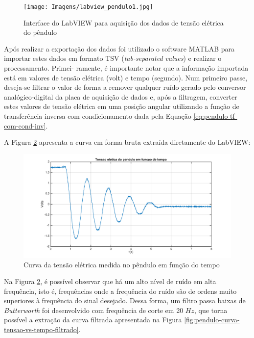 \documentclass[a4paper]{instrumentacao}
\begin{document}
\begin{figure}[H]
\centering
\texttt{[image: Imagens/labview\_pendulo1.jpg]}
\caption{Interface do LabVIEW para aquisição dos dados de tensão elétrica do pêndulo}
\label{fig:pendulo-LabVIEW}
\end{figure}

Após realizar a exportação dos dados foi utilizado o software MATLAB para importar estes dados em formato TSV (\textit{tab-separated values}) e realizar o processamento. Primei- ramente, é importante notar que a informação importada está em valores de tensão elétrica (volt) e tempo (segundo). Num primeiro passe, deseja-se filtrar o valor de forma a remover qualquer ruído gerado pelo conversor analógico-digital da placa de aquisição de dados e, após a filtragem, converter estes valores de tensão elétrica em uma posição angular utilizando a função de transferência inversa com condicionamento dada pela Equação \ref{eq:pendulo-tf-com-cond-inv}.

A Figura \ref{fig:pendulo-curva-tensao-vs-tempo} apresenta a curva em forma bruta extraída diretamente do LabVIEW:

\begin{figure}[H]
\centering
\includegraphics[width=\textwidth]{time-plot-raw.pdf}
\caption{Curva da tensão elétrica medida no pêndulo em função do tempo}
\label{fig:pendulo-curva-tensao-vs-tempo}
\end{figure}

Na Figura \ref{fig:pendulo-curva-tensao-vs-tempo}, é possível observar que há um alto nível de ruído em alta frequência, isto é, frequências onde a frequência do ruído são de ordens muito superiores à frequência do sinal desejado. Dessa forma, um filtro passa baixas de \textit{Butterworth} foi desenvolvido com frequência de corte em 20 $Hz$, que torna possível a extração da curva filtrada apresentada na Figura \ref{fig:pendulo-curva-tensao-vs-tempo-filtrado}.
\end{document}
